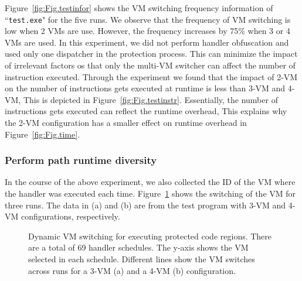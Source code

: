 \documentclass[preprint,12pt,3p]{elsarticle}
\begin{document}
Figure~\ref{fig:Fig.testinfor} shows the VM switching frequency information of ``\texttt{test.exe}" for the five runs.
We observe that the frequency of VM switching is low when 2 VMs are use.
However, the frequency increases by 75\% when 3 or 4 VMs are used.
In this experiment, we did not perform handler obfuscation and used only one dispatcher in the protection process.
This can minimize the impact of irrelevant factors os that only the multi-VM switcher can affect the number of instruction executed.
Through the experiment we found that the impact of 2-VM on the number of instructions gets executed at runtime is less than 3-VM and 4-VM,
This is depicted in Figure~\ref{fig:Fig.testinstr}.
Essentially, the number of instructions gets executed can reflect the runtime overhead,
This explains why the 2-VM configuration has a smaller effect on runtime overhead in Figure~\ref{fig:Fig.time}.



\subsubsection{Perform path runtime diversity}
In the course of the above experiment, we also collected the ID of the VM where the handler was executed each time.
Figure~\ref{fig:Fig.execvm} shows the switching of the VM for three runs.
The data in (a) and (b) are from the test program with 3-VM and 4-VM configurations, respectively.

\begin{figure}[t]
\centering
{}
\caption{Dynamic VM switching for executing protected code regions. There are a total of 69 handler schedules.
The y-axis shows the VM selected in each schedule. Different lines show the VM switches across runs for a 3-VM (a) and a 4-VM  (b) configuration.}\label{fig:Fig.execvm}
\end{figure}
\end{document}
